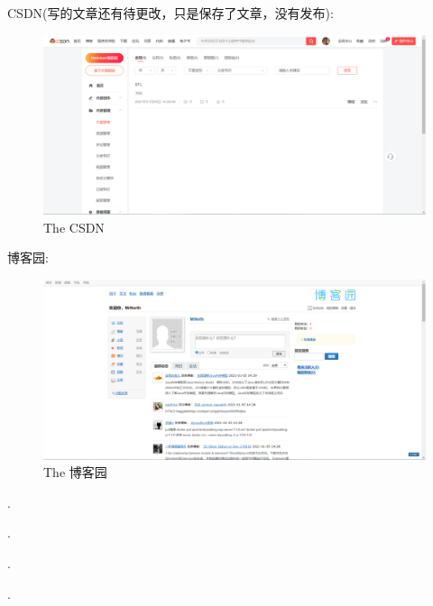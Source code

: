 \documentclass{article}
\begin{document}
\begin{itemize}
\begin{figure}[h!]
    		\label{fig:b2}
    	\end{figure}
    		CSDN(写的文章还有待更改，只是保存了文章，没有发布):\par
    		\begin{figure}[h!]
    			\centering
    			\includegraphics[scale=0.5]{CSDN}
    			\caption{The CSDN}
    			\label{fig:CSDN}
    		\end{figure}
    		博客园:
    		\begin{figure}[h!]
    			\centering
    			\includegraphics[scale=0.5]{bo}
    			\caption{The 博客园}
    			\label{fig:bo}
    		\end{figure}
    		
    .\par.\par.\par.\par
    

\end{itemize}

\hspace*{\fill} \\




\end{document}
